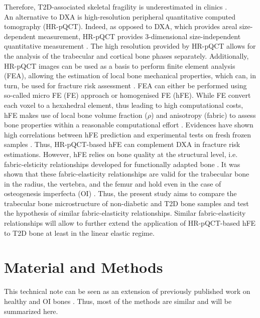 \documentclass[a4paper,fleqn]{DC_ArtStyle}
\begin{document}
	Therefore, T2D-associated skeletal fragility is underestimated in clinics \cite{Samelson2018}.
	\\[0.5em]
	An alternative to DXA is high-resolution peripheral quantitative computed tomography (HR-pQCT).
	Indeed, as opposed to DXA, which provides areal size-dependent measurement, HR-pQCT provides 3-dimensional size-independent quantitative measurement \cite{Whittier2020}.
	The high resolution provided by HR-pQCT allows for the analysis of the trabecular and cortical bone phases separately.
	Additionally, HR-pQCT images can be used as a basis to perform finite element analysis (FEA), allowing the estimation of local bone mechanical properties, which can, in turn, be used for fracture risk assessment \cite{Boutroy2008}.
	FEA can either be performed using so-called micro FE (\textmu FE) approach or homogenised FE (hFE).
	While \textmu FE convert each voxel to a hexahedral element, thus leading to high computational costs, hFE makes use of local bone volume fraction ($\rho$) and anisotropy (fabric) to assess bone properties within a reasonable computational effort \cite{Pahr2009}.
	Evidences have shown high correlations between hFE prediction and experimental tests on fresh frozen samples \cite{Varga2011, Hosseini2017, AriasMoreno2019, Schenk2022, Simon2024}.
	Thus, HR-pQCT-based hFE can complement DXA in fracture risk estimations.
	However, hFE relies on bone quality at the structural level, i.e. fabric-elsticity relationships developed for functionally adapted bone \cite{Zysset1998}.
	It was shown that these fabric-elasticity relationships are valid for the trabecular bone in the radius, the vertebra, and the femur \cite{Gross2012,Panyasantisuk2015} and hold even in the case of osteogenesis imperfecta (OI) \cite{Simon2022}.
	Thus, the present study aims to compare the trabecular bone microstructure of non-diabetic and T2D bone samples and test the hypothesis of similar fabric-elasticity relationships.
	Similar fabric-elasticity relationships will allow to further extend the application of HR-pQCT-based hFE to T2D bone at least in the linear elastic regime.

	
	\section{Material and Methods}
	This technical note can be seen as an extension of previously published work on healthy and OI bones \cite{Simon2022}.
	Thus, most of the methods are similar and will be summarized here.
	
\end{document}
